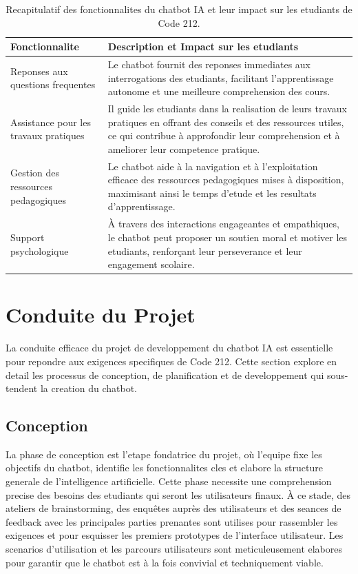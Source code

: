 \documentclass[a4paper, 11pt, openany]{report}
\begin{document}
\begin{table}[h!]
\centering
\begin{tabular}{|p{6cm}|p{10cm}|}
\hline
\textbf{Fonctionnalite} & \textbf{Description et Impact sur les etudiants} \\ \hline
Reponses aux questions frequentes & Le chatbot fournit des reponses immediates aux interrogations des etudiants, facilitant l'apprentissage autonome et une meilleure comprehension des cours. \\ \hline
Assistance pour les travaux pratiques & Il guide les etudiants dans la realisation de leurs travaux pratiques en offrant des conseils et des ressources utiles, ce qui contribue à approfondir leur comprehension et à ameliorer leur competence pratique. \\ \hline
Gestion des ressources pedagogiques & Le chatbot aide à la navigation et à l'exploitation efficace des ressources pedagogiques mises à disposition, maximisant ainsi le temps d'etude et les resultats d'apprentissage. \\ \hline
Support psychologique & À travers des interactions engageantes et empathiques, le chatbot peut proposer un soutien moral et motiver les etudiants, renforçant leur perseverance et leur engagement scolaire. \\ \hline
\end{tabular}
\caption{Recapitulatif des fonctionnalites du chatbot IA et leur impact sur les etudiants de Code 212.}
\label{tab:chatbotfeatures}
\end{table}

\section{Conduite du Projet}
La conduite efficace du projet de developpement du chatbot IA est essentielle pour repondre aux exigences specifiques de Code 212. Cette section explore en detail les processus de conception, de planification et de developpement qui sous-tendent la creation du chatbot.

\subsection{Conception}
La phase de conception est l'etape fondatrice du projet, où l'equipe fixe les objectifs du chatbot, identifie les fonctionnalites cles et elabore la structure generale de l'intelligence artificielle. Cette phase necessite une comprehension precise des besoins des etudiants qui seront les utilisateurs finaux. À ce stade, des ateliers de brainstorming, des enquêtes auprès des utilisateurs et des seances de feedback avec les principales parties prenantes sont utilises pour rassembler les exigences et pour esquisser les premiers prototypes de l'interface utilisateur. Les scenarios d'utilisation et les parcours utilisateurs sont meticuleusement elabores pour garantir que le chatbot est à la fois convivial et techniquement viable.
\end{document}

